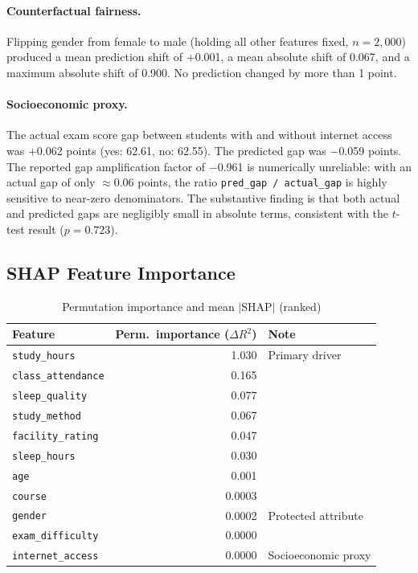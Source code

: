 \documentclass[12pt, letterpaper]{article}
\begin{document}
\paragraph{Counterfactual fairness.}
Flipping gender from female to male (holding all other features fixed, $n = 2{,}000$)
produced a mean prediction shift of $+$0.001, a mean absolute shift of 0.067, and a
maximum absolute shift of 0.900. No prediction changed by more than 1 point.

\paragraph{Socioeconomic proxy.}
The actual exam score gap between students with and without internet access was
$+$0.062 points (yes: 62.61, no: 62.55). The predicted gap was $-$0.059 points.
The reported gap amplification factor of $-$0.961 is numerically unreliable: with
an actual gap of only $\approx 0.06$ points, the ratio \texttt{pred\_gap / actual\_gap}
is highly sensitive to near-zero denominators. The substantive finding is that both
actual and predicted gaps are negligibly small in absolute terms, consistent with
the $t$-test result ($p = 0.723$).

\subsection{SHAP Feature Importance}

\begin{table}[H]
\centering
\caption{Permutation importance and mean $|$SHAP$|$ (ranked)}
\begin{tabular}{@{}lrl@{}}
\toprule
\textbf{Feature} & \textbf{Perm.\ importance ($\Delta R^2$)} & \textbf{Note} \\
\midrule
\texttt{study\_hours}      & 1.030  & Primary driver \\
\texttt{class\_attendance} & 0.165  & \\
\texttt{sleep\_quality}    & 0.077  & \\
\texttt{study\_method}     & 0.067  & \\
\texttt{facility\_rating}  & 0.047  & \\
\texttt{sleep\_hours}      & 0.030  & \\
\texttt{age}               & 0.001  & \\
\texttt{course}            & 0.0003 & \\
\texttt{gender}            & 0.0002 & Protected attribute \\
\texttt{exam\_difficulty}  & 0.0000 & \\
\texttt{internet\_access}  & 0.0000 & Socioeconomic proxy \\
\bottomrule
\end{tabular}
\end{table}
\end{document}
